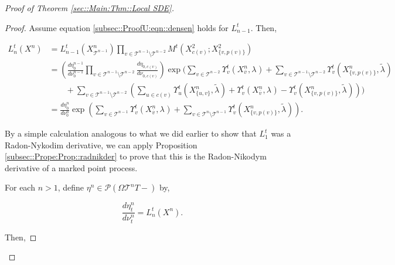 \documentclass[12pt]{article}
\newcommand{\mc}{\mathcal}
\newcommand{\ov}{\overline}
\newcommand{\ind}{\hspace{24pt}}
\newcommand{\pmsr}{\mc{P}}							%
\renewcommand{\v}{v}							%
\newcommand{\vv}{u}								%
\newcommand{\T}{T}								%
\renewcommand{\t}{t}							%
\newcommand{\cl}{\ov}							%
\newcommand{\pup}[1]{^{#1}}							%
\newcommand{\tree}{\mc{T}}							%
\newcommand{\numb}{n}								%
\newcommand{\rxvtsn}[3]{X_{#1}^{#3}{#2}}			%
\newcommand{\mm}[3]{\nu_{#2#1}^{#3}}						%
\newcommand{\mmm}[3]{\eta_{#2#1}^{#3}}						%
\newcommand{\rate}[1]{\lambda_{#1}}					%
\newcommand{\crate}[2]{\alt{\lambda}_{#1}^{#2}}		%
\newcommand{\alt}{\widetilde}						%
\newcommand{\dense}[2]{L_{#1}^{#2}}				%
\newcommand{\cdense}[2]{M_{#1}^{#2}}			%
\newcommand{\ds}[2]{\Upsilon_{#1}^{#2}}			%
\renewcommand{\c}[1]{c(#1)}						%
\newcommand{\p}[1]{p(#1)}						%
\begin{document}
\begin{proof}[Proof of Theorem \ref{sec::Main:Thm::Local SDE}]
\begin{proof}
Assume equation \eqref{subsec::ProofU:eqn::densen} holds for \(\dense{\numb-1}{\t}\). Then,

\begin{align*}
\dense{\numb}{\t}(\rxvtsn{}{}{\numb}) &= \dense{\numb-1}{\t}(\rxvtsn{\tree\pup{\numb-1}}{}{\numb})\prod_{\v\in\tree\pup{\numb-1}\setminus\tree\pup{\numb-2}} \cdense{}{\t}(\rxvtsn{\c{\v}}{}{2};\rxvtsn{\{\v,\p{\v}\}}{}{2})\\
&=\left(\frac{d\mmm{}{0}{\numb-1}}{d\mm{}{0}{\numb-1}}\prod_{\v\in\tree\pup{\numb-1}\setminus\tree\pup{\numb-2}}\frac{d\mmm{\c{\v}}{0,}{}}{d\mm{\c{\v}}{0,}{}}\right)\exp\Bigg(\sum_{\v\in\tree\pup{\numb-2}}\ds{\v}{\t}(\rxvtsn{\cl{\v}}{}{\numb},\rate{}) + \sum_{\v\in\tree\pup{\numb-1}\setminus\tree\pup{\numb-2}} \ds{\v}{\t}(\rxvtsn{\{\v,\p{\v}\}}{}{\numb},\crate{}{})\\
&\ind + \sum_{\v\in\tree\pup{\numb-1}\setminus\tree\pup{\numb-2}}\left(\sum_{\vv\in \c{\v}} \ds{\vv}{\t}(\rxvtsn{\{\vv,\v\}}{}{\numb},\crate{}{}) + \ds{\v}{\t}(\rxvtsn{\cl{\v}}{}{\numb},\rate{}) - \ds{\v}{\t}(\rxvtsn{\{\v,\p{\v}\}}{}{\numb},\crate{}{})\right)\Bigg)\\
&=\frac{d\mmm{}{0}{\numb}}{d\mm{}{0}{\numb}}\exp\left(\sum_{\v\in\tree\pup{\numb-1}}\ds{\v}{\t}(\rxvtsn{\cl{\v}}{}{\numb},\rate{}) + \sum_{\v\in\tree\pup{\numb}\setminus\tree\pup{\numb-1}} \ds{\v}{\t}(\rxvtsn{\{\v,\p{\v}\}}{}{\numb},\crate{}{})\right).
\end{align*}

By a simple calculation analogous to what we did earlier to show that \(\dense{1}{\t}\) was a Radon-Nykodim derivative, we can apply Proposition \ref{subsec::Prope:Prop::radnikder} to prove that this is the Radon-Nikodym derivative of a marked point process. 

\ind For each \(\numb > 1\), define \(\mmm{}{}{\numb} \in \pmsr(\Omega{\tree\pup{\numb}}{\T-})\) by,

\[\frac{d\mmm{}{\t}{\numb}}{d\mm{}{\t}{\numb}} = \dense{\numb}{\t}(\rxvtsn{}{}{\numb}).\]

Then,


\end{proof}
\end{proof}
\end{document}
